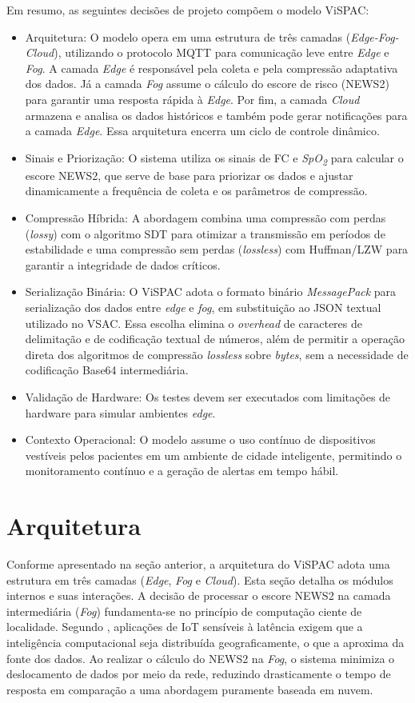 \documentclass[twoside,english,brazilian]{UNISINOSmonografia}
\begin{document}
Em resumo, as seguintes decisões de projeto compõem o modelo ViSPAC:
\begin{itemize}
\item Arquitetura: O modelo opera em uma estrutura de três camadas (\textit{Edge-Fog-Cloud}), utilizando o protocolo MQTT para comunicação leve entre \textit{Edge} e \textit{Fog}. A camada \textit{Edge} é responsável pela coleta e pela compressão adaptativa dos dados. Já a camada \textit{Fog} assume o cálculo do escore de risco (NEWS2) para garantir uma resposta rápida à \textit{Edge}. Por fim, a camada \textit{Cloud} armazena e analisa os dados históricos e também pode gerar notificações para a camada \textit{Edge}. Essa arquitetura encerra um ciclo de controle dinâmico.
\item Sinais e Priorização: O sistema utiliza os sinais de FC e \textit{SpO\textsubscript{2}} para calcular o escore NEWS2, que serve de base para priorizar os dados e ajustar dinamicamente a frequência de coleta e os parâmetros de compressão.
\item Compressão Híbrida: A abordagem combina uma compressão com perdas (\textit{lossy}) com o algoritmo SDT para otimizar a transmissão em períodos de estabilidade e uma compressão sem perdas (\textit{lossless}) com Huffman/LZW para garantir a integridade de dados críticos.
\item Serialização Binária: O ViSPAC adota o formato binário \textit{MessagePack} para serialização dos dados entre \textit{edge} e \textit{fog}, em substituição ao JSON textual utilizado no VSAC. Essa escolha elimina o \textit{overhead} de caracteres de delimitação e de codificação textual de números, além de permitir a operação direta dos algoritmos de compressão \textit{lossless} sobre \textit{bytes}, sem a necessidade de codificação Base64 intermediária.
\item Validação de Hardware: Os testes devem ser executados com limitações de hardware para simular ambientes \textit{edge}.
\item Contexto Operacional: O modelo assume o uso contínuo de dispositivos vestíveis pelos pacientes em um ambiente de cidade inteligente, permitindo o monitoramento contínuo e a geração de alertas em tempo hábil.
\end{itemize}

\section{Arquitetura}
\label{sec:arquitetura}
Conforme apresentado na seção anterior, a arquitetura do ViSPAC adota uma estrutura em três camadas (\textit{Edge}, \textit{Fog} e \textit{Cloud}). Esta seção detalha os módulos internos e suas interações. A decisão de processar o escore NEWS2 na camada intermediária (\textit{Fog}) fundamenta-se no princípio de computação ciente de localidade. Segundo \cite{bonomi2012}, aplicações de IoT sensíveis à latência exigem que a inteligência computacional seja distribuída geograficamente, o que a aproxima da fonte dos dados. Ao realizar o cálculo do NEWS2 na \textit{Fog}, o sistema minimiza o deslocamento de dados por meio da rede, reduzindo drasticamente o tempo de resposta em comparação a uma abordagem puramente baseada em nuvem.
\end{document}

